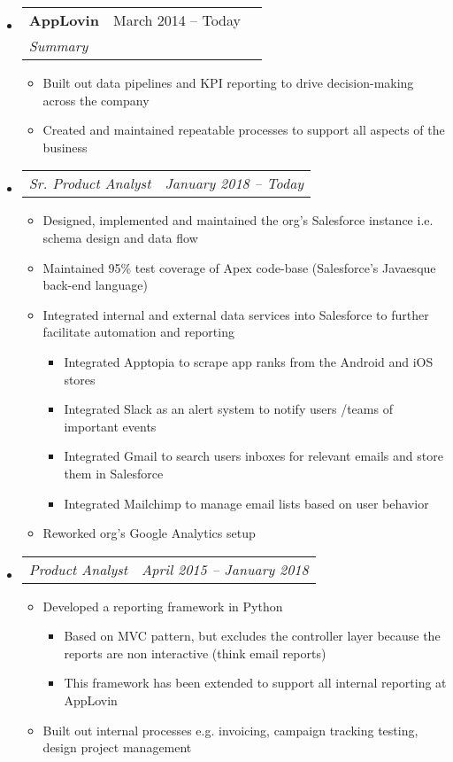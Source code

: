 \documentclass{article}
\newcommand{\resumeheading}[1]{
    \noindent
    \fcolorbox{mygrey}{mygrey}{%
        \parbox{\dimexpr\linewidth-2\fboxsep-2\fboxrule}{\large#1}}
}
\newcommand{\splitresumesubheading}[3]{
    \begin{tabularx}{\linewidth}{XcX}
	    	\textbf{#1} & #2 \\
		    \textit{#3}
    \end{tabularx}
    \vspace{-3ex}
}
\newcommand{\resumesubsubheading}[2]{
    \begin{tabularx}{\linewidth}{Xc}
		\textit{#1} & \textit{#2} \\
    \end{tabularx}
    \vspace{-4ex}
}
\newcommand{\resumeitem}[1]{
    \item #1 
    \vspace{-2pt}
}
\begin{document}
\resumeheading{Experience}
\begin{itemize}
    \item \splitresumesubheading{AppLovin}{March 2014 -- Today}
                                {Summary}
    \begin{itemize}
        \resumeitem{Built out data pipelines and KPI reporting to drive decision-making across the company}
        \resumeitem{Created and maintained repeatable processes to support all aspects of the business}
    \end{itemize}
    \item \resumesubsubheading{Sr. Product Analyst}{January 2018 -- Today}
    \begin{itemize}
        \resumeitem{Designed, implemented and maintained the org’s Salesforce instance i.e. schema design and data flow}
        \resumeitem{Maintained 95\% test coverage of Apex code-base (Salesforce's Javaesque back-end language)}
        \resumeitem{Integrated internal and external data services into Salesforce to further facilitate automation and reporting}
        \vspace{-3ex}
        \begin{itemize}
            \resumeitem{Integrated Apptopia to scrape app ranks from the Android and iOS stores}
            \resumeitem{Integrated Slack as an alert system to notify users /teams of important events}
            \resumeitem{Integrated Gmail to search users inboxes for relevant emails and store them in Salesforce}
            \resumeitem{Integrated Mailchimp to manage email lists based on user behavior}
        \end{itemize}
        \resumeitem{Reworked org’s Google Analytics setup}
    \end{itemize}
    \item \resumesubsubheading{Product Analyst}{April 2015 -- January 2018}
    \begin{itemize}
        \resumeitem{Developed a reporting framework in Python}
        \begin{itemize}
            \resumeitem{Based on MVC pattern, but excludes the controller layer because the reports are non interactive (think email reports)}
            \resumeitem{This framework has been extended to support all internal reporting at AppLovin}
        \end{itemize}
        \resumeitem{Built out internal processes e.g. invoicing, campaign tracking testing, design project management}
    \end{itemize}

\end{itemize}
\end{document}
